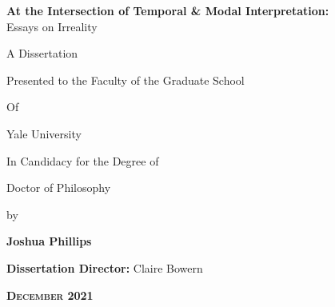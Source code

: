 \documentclass[11pt,dvipsnames]{report}
\date{}
\newcommand{\HRule}{\rule{\linewidth}{0.5mm}}
\begin{document}
	

	
\begin{center}
	\thispagestyle{empty}\setmainfont{Linux Libertine Display O}
	\vfill
	\vspace{.33cm}
	{\Large
	\setcounter{page}{-1}
\vspace*{.75in}	\textbf{ At the Intersection of Temporal \& Modal Interpretation:}\\
		{Essays on Irreality}%
	
	\vfill\vfill
	A Dissertation
	
	Presented to the Faculty of the Graduate School%
	
	Of
	
	Yale University
	
	In Candidacy for the Degree of 
	
	Doctor of Philosophy
	\vfill	\vfill
	{ by
		
		{\textbf{Joshua Phillips}}%
	}
	\vspace{.6in}
	
	\textbf{Dissertation Director\thinspace:} Claire Bowern

	
	
	
%	
	\vspace{.6in}
\textbf{\textsc{December 2021}}

}
	
	
\end{center}
\end{document}
